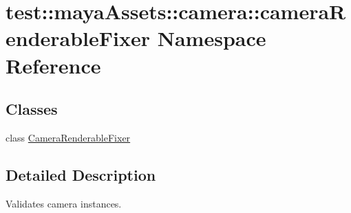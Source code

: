 \hypertarget{namespacetest_1_1mayaAssets_1_1camera_1_1cameraRenderableFixer}{\section{test\-:\-:maya\-Assets\-:\-:camera\-:\-:camera\-Renderable\-Fixer \-Namespace \-Reference}
\label{d4/d5f/namespacetest_1_1mayaAssets_1_1camera_1_1cameraRenderableFixer}
}
\subsection*{\-Classes}
\begin{DoxyCompactItemize}
\item 
class \hyperlink{classtest_1_1mayaAssets_1_1camera_1_1cameraRenderableFixer_1_1CameraRenderableFixer}{\-Camera\-Renderable\-Fixer}
\end{DoxyCompactItemize}


\subsection{\-Detailed \-Description}
\begin{DoxyVerb}
Validates camera instances.
\end{DoxyVerb}
 